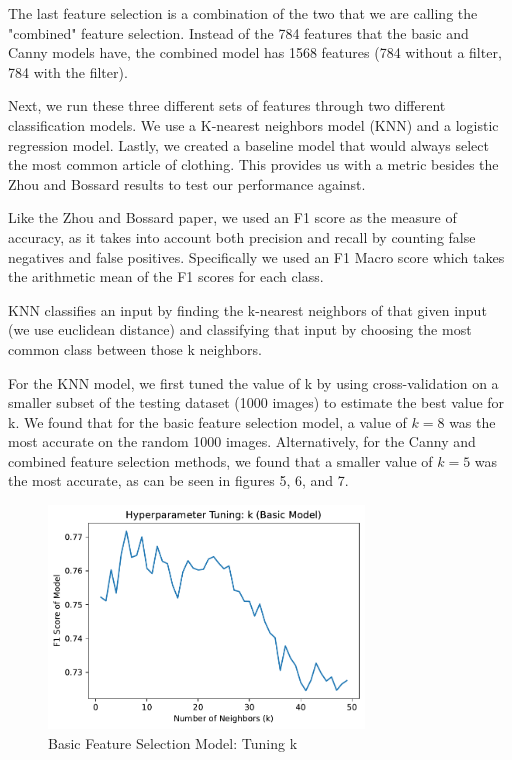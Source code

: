 The last feature selection is a combination of the two that we are calling the "combined" feature selection. Instead of the 784 features that the basic and Canny models have, the combined model has 1568 features (784 without a filter, 784 with the filter).

Next, we run these three different sets of features through two different classification models. We use a K-nearest neighbors model (KNN) and a logistic regression model. Lastly, we created a baseline model that would always select the most common article of clothing. This provides us with a metric besides the Zhou and Bossard results to test our performance against.

Like the Zhou and Bossard paper, we used an F1 score as the measure of accuracy, as it takes into account both precision and recall by counting false negatives and false positives. Specifically we used an F1 Macro score which takes the arithmetic mean of the F1 scores for each class.

KNN classifies an input by finding the k-nearest neighbors of that given input (we use euclidean distance) and classifying that input by choosing the most common class between those k neighbors.

For the KNN model, we first tuned the value of k by using cross-validation on a smaller subset of the testing dataset (1000 images) to estimate the best value for k. We found that for the basic feature selection model, a value of $k=8$ was the most accurate on the random 1000 images. Alternatively, for the Canny and combined feature selection methods, we found that a smaller value of $k=5$ was the most accurate, as can be seen in figures 5, 6, and 7.

\begin{figure}[!h]
    \centering
    \includegraphics[width=3.3in]{tuning_k_basic.pdf}
    \caption{Basic Feature Selection Model: Tuning k}
    \label{fig:my_label}
\end{figure}

